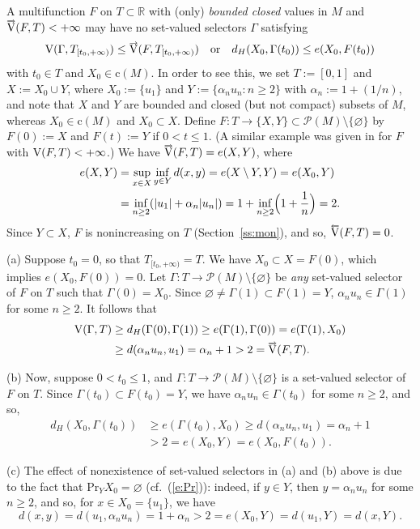 \documentclass[preprint,12pt]{elsarticle}
\newcommand{\eq}[1]{\mbox{\rm(\ref{#1})}}
\newcommand{\Rb}{\mathbb{R}}  \newcommand{\Nb}{\mathbb{N}}
\newcommand{\es}{\varnothing}
\newcommand{\nV}{\mbox{\rm V}}
\newcommand{\riV}{{\scriptstyle\overrightarrow{\mbox{\rm V}}}}
\newcommand{\leV}{{\scriptstyle\overleftarrow{\mbox{\rm V}}}}
\begin{document}
\begin{exa} \label{ex1}
A multifunction $F$ on $T\subset\Rb$ with (only) \emph{bounded closed\/} values
in $M$ and $\riV(F,T)<+\infty$ may have no set-valued selectors $\Gamma$ satisfying
  \begin{equation} \label{e:zz}
\nV(\Gamma,T_{[t_0,+\infty)})\le\riV(F,T_{[t_0,+\infty)})\quad\mbox{or}
  \quad d_H(X_0,\Gamma(t_0))\le e(X_0,F(t_0))
  \end{equation}
with $t_0\in T$ and $X_0\in\mbox{c}(M)$. In order to see this, we set
$T:=[0,1]$ and $X:=X_0\cup Y$, where $X_0:=\{u_1\}$ and
$Y:=\{\alpha_nu_n:n\ge2\}$ with $\alpha_n:=1+(1/n)$, and note that $X$ and $Y$
are bounded and closed (but not compact) subsets of $M$, whereas
$X_0\in\mbox{c}(M)$ and $X_0\subset X$.
Define $F:T\to\{X,Y\}\subset\mathcal{P}(M)\setminus\{\es\}$ by
$F(0):=X$ and $F(t):=Y$ if $0<t\le1$. (A similar example was given in
\cite[Example~2]{JMAA} for $F$ with $\nV(F,T)<+\infty$.) We have
$\riV(F,T)=e(X,Y)$, where
  \begin{align*}
e(X,Y)&=\sup_{x\in X}\inf_{y\in Y}d(x,y)=e(X\setminus Y,Y)=e(X_0,Y)\\
&=\inf_{n\ge2}(|u_1|+\alpha_n|u_n|)=1+\inf_{n\ge2}\Bigl(1+\frac1n\Bigr)=2.
  \end{align*}
Since $Y\subset X$, $F$ is nonincreasing on $T$ (Section~\ref{ss:mon}), and so,
$\leV(F,T)=0$.

(a) Suppose $t_0=0$, so that $T_{[t_0,+\infty)}=T$. We have $X_0\subset X=F(0)$,
which implies $e(X_0,F(0))=0$. Let $\Gamma:T\to\mathcal{P}(M)\setminus\{\es\}$
be \emph{any\/} set-valued selector of $F$ on $T$ such that $\Gamma(0)=X_0$.
Since $\es\ne\Gamma(1)\subset F(1)=Y$, $\alpha_nu_n\in\Gamma(1)$ for some
$n\ge2$. It follows that
  \begin{align*}
\nV(\Gamma,T)&\ge d_H(\Gamma(0),\Gamma(1))\ge e(\Gamma(1),\Gamma(0))
  =e(\Gamma(1),X_0)\\[1pt]
&\ge d(\alpha_nu_n,u_1)=\alpha_n+1>2=\riV(F,T).
  \end{align*}

(b) Now, suppose $0<t_0\le1$, and $\Gamma:T\to\mathcal{P}(M)\setminus\{\es\}$
is a set-valued selector of $F$ on $T$. Since $\Gamma(t_0)\subset F(t_0)=Y$,
we have $\alpha_nu_n\in\Gamma(t_0)$ for some $n\ge2$, and so,
  \begin{align*}
d_H(X_0,\Gamma(t_0))&\ge e(\Gamma(t_0),X_0)\ge d(\alpha_nu_n,u_1)
  =\alpha_n+1\\[3pt]
&>2=e(X_0,Y)=e(X_0,F(t_0)).
  \end{align*}

(c) The effect of nonexistence of set-valued selectors in (a) and (b) above is due to
the fact that $\mbox{Pr}_YX_0=\es$ (cf.~\eq{e:Pr}): indeed, if $y\in Y$, then
$y=\alpha_nu_n$ for some $n\ge2$, and so, for $x\in X_0=\{u_1\}$, we have
  \begin{equation*}
d(x,y)=d(u_1,\alpha_nu_n)=1+\alpha_n>2=e(X_0,Y)=d(u_1,Y)=d(x,Y).
  \end{equation*}
\end{exa}
\end{document}
